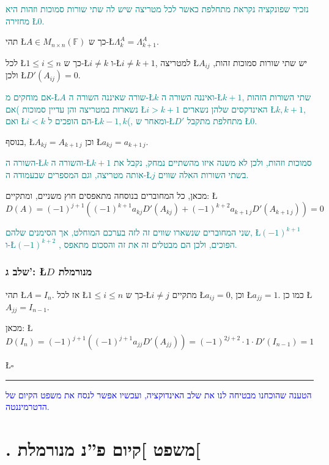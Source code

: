 \documentclass[english,hebrew]{article}
\begin{document}
\textcolor{teal}{נזכיר שפונקציה נקראת מתחלפת כאשר לכל מטריצה שיש לה
שתי שורות סמוכות וזהות היא מחזירה \L{$0$}.}

תהי \L{$A\in M_{n\times n}(\mathbb{F})$} כך ש-\L{$\Lambda_{k}^{A}=\Lambda_{k+1}^{A}$}.

לכל \L{$1\le i\le n$} כך ש-\L{$i\neq k$} ו-\L{$i\neq k+1$}, למטריצה
\L{$A_{ij}$} יש שתי שורות סמוכות זהות, ולכן \L{$D'(A_{ij})=0$}.

\textcolor{teal}{אם מוחקים מ-\L{$A$} שורה שאיננה השורה ה-\L{$k$}
ואיננה השורה ה-\L{$k+1$}, שתי השורות הזהות נשארות במטריצה והן עדיין
סמוכות )אם \L{$i>k+1$} האינדקסים שלהן נשארים \L{$k,k+1$}, ואם \L{$i<k$}
הם הופכים ל-\L{$k-1,k$}(, ומאחר ש-\L{$D'$} מתחלפת מתקבל \L{$0$}.}

בנוסף, \L{$A_{kj}=A_{k+1\,j}$} וכן \L{$a_{kj}=a_{k+1\,j}$}.

\textcolor{teal}{השורה ה-\L{$k$} והשורה ה-\L{$k+1$} סמוכות וזהות,
ולכן לא משנה איזו מהשתיים נמחק, נקבל את אותה מטריצה, וגם המספרים שבעמודה
ה-\L{$j$} בשתי השורות האלה שווים.}

מכאן, כל המחוברים בנוסחה מתאפסים חוץ משניים, ומתקיים: \L{%
\[
D(A)=(-1)^{j+1}\left((-1)^{k+1}a_{kj}D'(A_{kj})+(-1)^{k+2}a_{k+1\,j}D'(A_{k+1\,j})\right)=0
\]
}%

\textcolor{teal}{שני המחוברים שנשארו שווים זה לזה בערכם המוחלט, אך
הסימנים שלהם, \L{$(-1)^{k+1}$} ו-\L{$(-1)^{k+2}$} , הפוכים, ולכן
הם מבטלים זה את זה והסכום מתאפס.}

\subsubsection{שלב ג': \L{$D$} מנורמלת}

תהי \L{$A=I_{n}$}. אז לכל \L{$1\le i\le n$} כך ש-\L{$i\neq j$}
מתקיים \L{$a_{ij}=0$}, וכן \L{$a_{jj}=1$}. כמו כן \L{$A_{jj}=I_{n-1}$}.

מכאן: \L{%
\[
D(I_{n})=(-1)^{j+1}\left((-1)^{j+1}a_{jj}D'(A_{jj})\right)=(-1)^{2j+2}\cdot1\cdot D'(I_{n-1})=1
\]
}%

\hfill{}\L{$\square$}

\medskip{}

\rule[0.5ex]{1\columnwidth}{1pt}

\medskip{}

\textcolor{blue}{הטענה שהוכחנו מבטיחה לנו את שלב האינדוקציה, ועכשיו
אפשר לנסח את משפט הקיום של הדטרמיננטה.}

\section{{\endL}. משפט {]}קיום פ\textquotedblright נ מנורמלת{[}}
\end{document}
